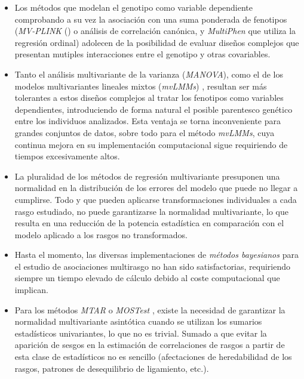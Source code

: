 \documentclass[IB,BIB]{TFUOC}%
\begin{document}
\begin{itemize}
    \item Los métodos que modelan el genotipo como variable dependiente comprobando a su vez la asociación con una suma ponderada de fenotipos (\textit{MV-PLINK} (\cite{ferreira_multivariate_2009}) o análisis de correlación canónica, y \textit{\gls{MultiPhen}} \cite{coin_multiphen_2020} que utiliza la regresión ordinal) adolecen de la posibilidad de evaluar diseños complejos que presentan mutiples interacciones entre el genotipo y otras covariables.
    \item Tanto el análisis multivariante de la varianza (\textit{\gls{MANOVA}}), como el de los modelos multivariantes lineales mixtos (\textit{\gls{mvLMMs}}) \cite{zhou_efficient_2014}, resultan ser más tolerantes a estos diseños complejos al tratar los fenotipos como variables dependientes, introduciendo de forma natural el posible parentesco genético entre los individuos analizados. Esta ventaja se torna inconveniente para grandes conjuntos de datos, sobre todo para el método \textit{mvLMMs}, cuya continua mejora en su implementación computacional sigue requiriendo de tiempos excesivamente altos.
    \item La pluralidad de los métodos de regresión multivariante presuponen una normalidad en la distribución de los errores del modelo que puede no llegar a cumplirse. Todo y que pueden aplicarse transformaciones individuales a cada rasgo estudiado, no puede garantizarse la normalidad multivariante, lo que resulta en una reducción de la potencia estadística en comparación con el modelo aplicado a los rasgos no transformados.
    \item Hasta el momento, las diversas implementaciones de \textit{métodos bayesianos} para el estudio de asociaciones multirasgo no han sido satisfactorias, requiriendo siempre un tiempo elevado de cálculo debido al coste computacional que implican.
    \item Para los métodos \textit{\gls{MTAR}} \cite{luo_multi-trait_2020} o \textit{\gls{MOSTest}} \cite{noauthor_precimedmostest_2023} \cite{van_der_meer_understanding_2020}, existe la necesidad de garantizar la normalidad multivariante asintótica cuando se utilizan los sumarios estadísticos univariantes, lo que no es trivial. Sumado a que evitar la aparición de sesgos en la estimación de correlaciones de rasgos a partir de esta clase de estadísticos no es sencillo (afectaciones de heredabilidad de los rasgos, patrones de desequilibrio de ligamiento, etc.).
\end{itemize}
\end{document}
